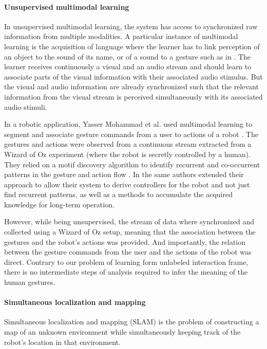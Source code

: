 \paragraph{Unsupervised multimodal learning} In unsupervised multimodal learning, the system has access to synchronized raw information from multiple modalities. A particular instance of multimodal learning is the acquisition of language where the learner has to link perception of an object to the sound of its name, or of a sound to a gesture such as in \cite{mangin2013learning}. The learner receives continuously a visual and an audio stream and should learn to associate parts of the visual information with their associated audio stimulus. But the visual and audio information are already synchronized such that the relevant information from the visual stream is perceived simultaneously with its associated audio stimuli.

In a robotic application, Yasser Mohammad et al. used multimodal learning to segment and associate gesture commands from a user to actions of a robot \cite{mohammad2009unsupervised}. The gestures and actions were observed from a continuous stream extracted from a Wizard of Oz experiment (where the robot is secretly controlled by a human). They relied on a motif discovery algorithm to identify recurrent and co-occurrent patterns in the gesture and action flow \cite{mohammad2009constrained}. In \cite{mohammad2010learning} the same authors extended their approach to allow their system to derive controllers for the robot and not just find recurrent patterns, as well as a methods to accumulate the acquired knowledge for long-term operation.

However, while being unsupervised, the stream of data where synchronized and collected using a Wizard of Oz setup, meaning that the association between the gestures and the robot's actions was provided. And importantly, the relation between the gesture commands from the user and the actions of the robot was direct. Contrary to our problem of learning form unlabeled interaction frame, there is no intermediate steps of analysis required to infer the meaning of the human gestures.

\paragraph{Simultaneous localization and mapping}

Simultaneous localization and mapping (SLAM) \cite{smith1990estimating,dissanayake2001solution} is  the problem of constructing a map of an unknown environment while simultaneously keeping track of the robot's location in that environment. 

